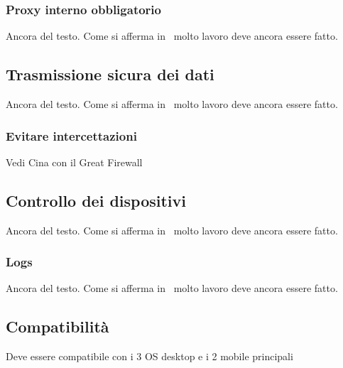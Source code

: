 \subsubsection{Proxy interno obbligatorio}
Ancora del testo. Come si afferma in~\cite{jones96analysis} molto lavoro deve ancora essere fatto.

\subsection{Trasmissione sicura dei dati}
Ancora del testo. Come si afferma in~\cite{jones96analysis} molto lavoro deve ancora essere fatto.
\subsubsection{Evitare intercettazioni}
Vedi Cina con il Great Firewall

\subsection{Controllo dei dispositivi}
Ancora del testo. Come si afferma in~\cite{jones96analysis} molto lavoro deve ancora essere fatto.
\subsubsection{Logs}
Ancora del testo. Come si afferma in~\cite{jones96analysis} molto lavoro deve ancora essere fatto.

\subsection{Compatibilità}
Deve essere compatibile con i 3 OS desktop e i 2 mobile principali